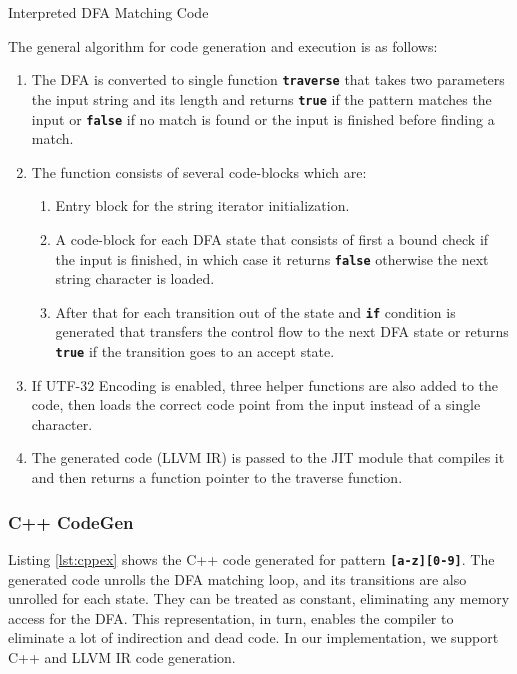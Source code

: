 \begin{listing}[htbp]
\inputminted[breaklines=true,frame=lines,linenos]{cpp}{code/interpretted.cpp}
\caption[Interpreted DFA Code]{Interpreted DFA Matching Code}
\label{lst:dfainterpreted}
\end{listing}

The general algorithm for code generation and execution is as follows:
\begin{enumerate}
    \item The DFA is converted to single function \texttt{\textbf{traverse}} that takes two parameters the input string and its length and returns \texttt{\textbf{true}} if the pattern matches the input or \texttt{\textbf{false}} if no match is found or the input is finished before finding a match.
    \item The function consists of several code-blocks which are:
    \begin{enumerate}
        \item Entry block for the string iterator initialization.
        \item A code-block for each DFA state that consists of first a bound check if the input is finished, in which case it returns \texttt{\textbf{false}} otherwise the next string character is loaded.
        \item After that for each transition out of the state and \texttt{\textbf{if}} condition is generated that transfers the control flow to the next DFA state or returns \texttt{\textbf{true}} if the transition goes to an accept state.
    \end{enumerate}
    \item If UTF-32 Encoding is enabled, three helper functions are also added to the code, then loads the correct code point from the input instead of a single character.
    \item The generated code (LLVM IR) is passed to the JIT module that compiles it and then returns a function pointer to the traverse function. 
\end{enumerate}

\subsubsection{C++ CodeGen}
Listing \ref{lst:cppex} shows the C++ code generated for pattern \texttt{\textbf{[a-z][0-9]}}. The generated code unrolls the DFA matching loop, and its transitions are also unrolled for each state. They can be treated as constant, eliminating any memory access for the DFA. This representation, in turn, enables the compiler to eliminate a lot of indirection and dead code. In our implementation, we support C++ and LLVM IR code generation.


